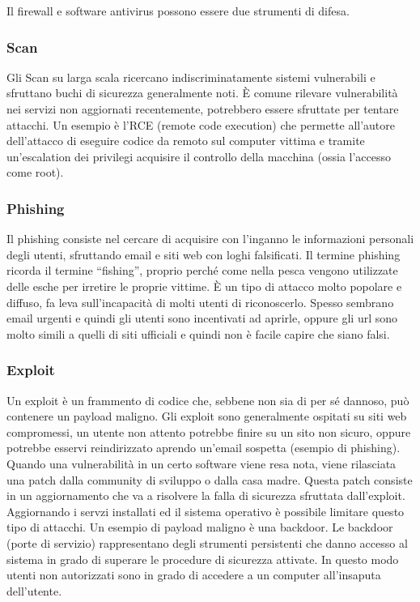 Il firewall e software antivirus possono essere due strumenti di difesa.

\subsubsection{Scan}

Gli Scan su larga scala ricercano indiscriminatamente sistemi vulnerabili e sfruttano buchi di sicurezza generalmente noti. È comune rilevare vulnerabilità nei servizi non aggiornati recentemente, potrebbero essere sfruttate per tentare attacchi. Un esempio è l'RCE (remote code execution) che permette all'autore dell'attacco di eseguire codice da remoto sul computer vittima e tramite un'escalation dei privilegi acquisire il controllo della macchina (ossia l'accesso come root).

\subsubsection{Phishing}

Il phishing consiste nel cercare di acquisire con l’inganno le informazioni personali degli utenti, sfruttando email e siti web con loghi falsificati. Il termine phishing ricorda il termine  ``fishing'', proprio perché come nella pesca vengono utilizzate delle esche per irretire le proprie vittime. È un tipo di attacco molto popolare e diffuso, fa leva sull'incapacità di molti utenti di riconoscerlo. Spesso sembrano email urgenti e quindi gli utenti sono incentivati ad aprirle, oppure gli url sono molto simili a quelli di siti ufficiali e quindi non è facile capire che siano falsi.

\subsubsection{Exploit}

Un exploit è un frammento di codice che, sebbene non sia di per sé dannoso, può contenere un payload maligno. Gli exploit sono generalmente ospitati su siti web compromessi, un utente non attento potrebbe finire su un sito non sicuro, oppure potrebbe esservi reindirizzato aprendo un'email sospetta (esempio di phishing).
Quando una vulnerabilità in un certo software viene resa nota, viene rilasciata una patch dalla community di sviluppo o dalla casa madre. Questa patch consiste in un aggiornamento che va a risolvere la falla di sicurezza sfruttata dall'exploit.
Aggiornando i servzi installati ed il sistema operativo è possibile limitare questo tipo di attacchi.
Un esempio di payload maligno è una backdoor. Le backdoor (porte di servizio) rappresentano degli strumenti persistenti che danno accesso al sistema in grado di superare le procedure di sicurezza attivate. In questo modo utenti non autorizzati sono in grado di accedere a un computer all’insaputa dell’utente.

